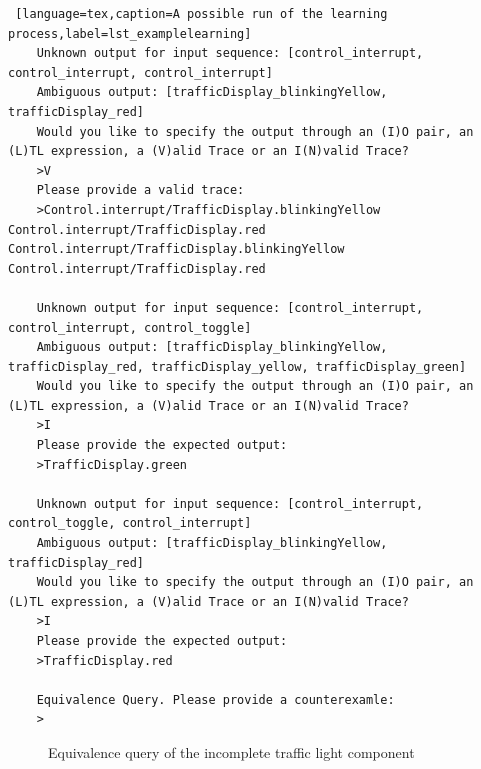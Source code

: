\begin{lstlisting} [language=tex,caption=A possible run of the learning process,label=lst_examplelearning]
	Unknown output for input sequence: [control_interrupt, control_interrupt, control_interrupt]
	Ambiguous output: [trafficDisplay_blinkingYellow, trafficDisplay_red]
	Would you like to specify the output through an (I)O pair, an (L)TL expression, a (V)alid Trace or an I(N)valid Trace?
	>V
	Please provide a valid trace:
	>Control.interrupt/TrafficDisplay.blinkingYellow Control.interrupt/TrafficDisplay.red Control.interrupt/TrafficDisplay.blinkingYellow Control.interrupt/TrafficDisplay.red
	
	Unknown output for input sequence: [control_interrupt, control_interrupt, control_toggle]
	Ambiguous output: [trafficDisplay_blinkingYellow, trafficDisplay_red, trafficDisplay_yellow, trafficDisplay_green]
	Would you like to specify the output through an (I)O pair, an (L)TL expression, a (V)alid Trace or an I(N)valid Trace?
	>I
	Please provide the expected output:
	>TrafficDisplay.green
	
	Unknown output for input sequence: [control_interrupt, control_toggle, control_interrupt]
	Ambiguous output: [trafficDisplay_blinkingYellow, trafficDisplay_red] 
	Would you like to specify the output through an (I)O pair, an (L)TL expression, a (V)alid Trace or an I(N)valid Trace?
	>I
	Please provide the expected output:
	>TrafficDisplay.red
	
	Equivalence Query. Please provide a counterexamle:
	>
\end{lstlisting}

\bigskip
\begin{figure}[!ht] 
	\centering
	\caption{Equivalence query of the incomplete traffic light component} 
	\label{fig_trafficlightincomplete}
\end{figure}
